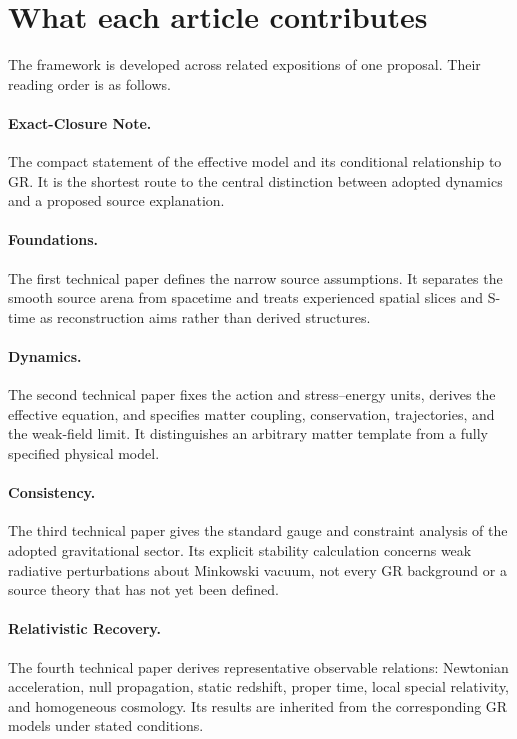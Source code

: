 \documentclass[11pt]{article}
\begin{document}
\section{What each article contributes}
The framework is developed across related expositions of one proposal. Their reading order is as follows.

\paragraph{Exact-Closure Note.} The compact statement of the effective model and its conditional relationship to GR. It is the shortest route to the central distinction between adopted dynamics and a proposed source explanation.

\paragraph{Foundations.} The first technical paper defines the narrow source assumptions. It separates the smooth source arena from spacetime and treats experienced spatial slices and S-time as reconstruction aims rather than derived structures.

\paragraph{Dynamics.} The second technical paper fixes the action and stress--energy units, derives the effective equation, and specifies matter coupling, conservation, trajectories, and the weak-field limit. It distinguishes an arbitrary matter template from a fully specified physical model.

\paragraph{Consistency.} The third technical paper gives the standard gauge and constraint analysis of the adopted gravitational sector. Its explicit stability calculation concerns weak radiative perturbations about Minkowski vacuum, not every GR background or a source theory that has not yet been defined.

\paragraph{Relativistic Recovery.} The fourth technical paper derives representative observable relations: Newtonian acceleration, null propagation, static redshift, proper time, local special relativity, and homogeneous cosmology. Its results are inherited from the corresponding GR models under stated conditions.
\end{document}
